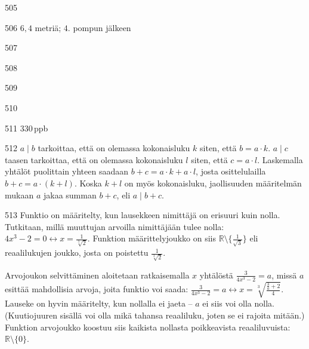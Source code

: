 \begin{Vastaus}{505}
	
\end{Vastaus}
\begin{Vastaus}{506}
	 $6,4$ metriä; $4$. pompun jälkeen
	
\end{Vastaus}
\begin{Vastaus}{507}
	
\end{Vastaus}
\begin{Vastaus}{508}
	
\end{Vastaus}
\begin{Vastaus}{509}
	
\end{Vastaus}
\begin{Vastaus}{510}
	
\end{Vastaus}
\begin{Vastaus}{511}
	$330$\,ppb %
	
\end{Vastaus}
\begin{Vastaus}{512}
	$a	\mid b$ tarkoittaa, että on olemassa kokonaisluku $k$ siten, että $b=a\cdot k$. $a \mid c$ taasen tarkoittaa, että on olemassa kokonaisluku $l$ siten, että $c=a\cdot l$. Laskemalla yhtälöt puolittain yhteen saadaan $b+c=a\cdot k + a\cdot l$, josta osittelulailla $b+c=a\cdot (k+l)$. Koska $k+l$ on myös kokonaisluku, jaollisuuden määritelmän mukaan $a$ jakaa summan $b+c$, eli $a\mid b+c$.
	
\end{Vastaus}
\begin{Vastaus}{513}
Funktio on määritelty, kun lausekkeen nimittäjä on erisuuri kuin nolla. Tutkitaan, millä muuttujan arvoilla nimittäjään tulee nolla: $4x^3-2=0 \leftrightarrow x=\frac{1}{\sqrt[3]{2}}$. Funktion määrittelyjoukko on siis $\mathbb{R}\setminus\lbrace\frac{1}{\sqrt{3}} \rbrace$ eli reaalilukujen joukko, josta on poistettu $\frac{1}{\sqrt[3]{2}}$.

Arvojoukon selvittäminen aloitetaan ratkaisemalla $x$ yhtälöstä $\frac{3}{4x^3-2}=a$, missä $a$ esittää mahdollisia arvoja, joita funktio voi saada: $\frac{3}{4x^3-2}=a \leftrightarrow x= \sqrt[3]{\frac{\frac{3}{a}+2}{4}}$. Lauseke on hyvin määritelty, kun nollalla ei jaeta -- $a$ ei siis voi olla nolla. (Kuutiojuuren sisällä voi olla mikä tahansa reaaliluku, joten se ei rajoita mitään.) Funktion arvojoukko koostuu siis kaikista nollasta poikkeavista reaaliluvuista: $\mathbb{R}\setminus \lbrace 0 \rbrace$.
	
\end{Vastaus}
